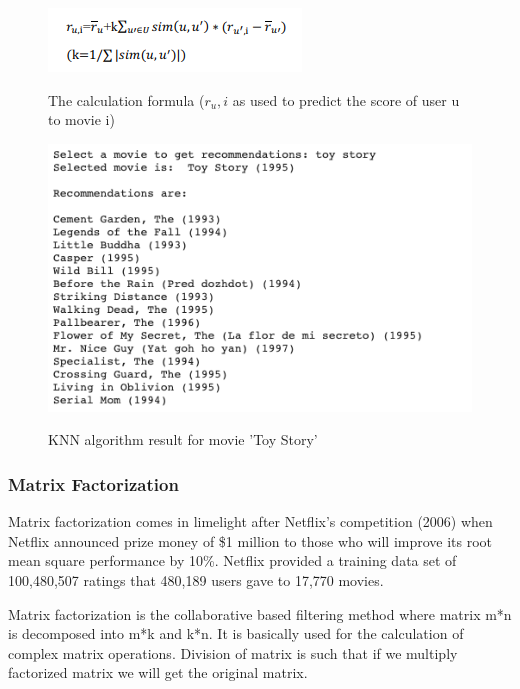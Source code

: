\documentclass[onecolumn]{article}
\begin{document}
\begin{figure}[h!t]
\centering
{\centering
    \includegraphics[width=0.4\linewidth]{figures/formula.png}}        
\caption{The calculation formula 
($r_u,i$ as used to predict the score of user u to movie i)}
\end{figure}

\pagebreak

\begin{figure}[h!t]
\centering
{\centering
    \includegraphics[width=0.8\linewidth]{figures/result2.png}}        
\caption{KNN algorithm result for movie 'Toy Story'}
\end{figure}

\vspace{10mm}

\subsubsection{Matrix Factorization}
\hspace{0.5cm}Matrix factorization comes in limelight after Netflix's competition (2006) when Netflix announced prize money of \$1 million to those who will improve its root mean square performance by 10\%. Netflix provided a training data set of 100,480,507 ratings that 480,189 users gave to 17,770 movies.
\vspace{4mm}

Matrix factorization is the collaborative based filtering method where matrix m*n is decomposed into m*k and k*n. It is basically used for the calculation of complex matrix operations. Division of matrix is such that if we multiply factorized matrix we will get the original matrix.
\end{document}

